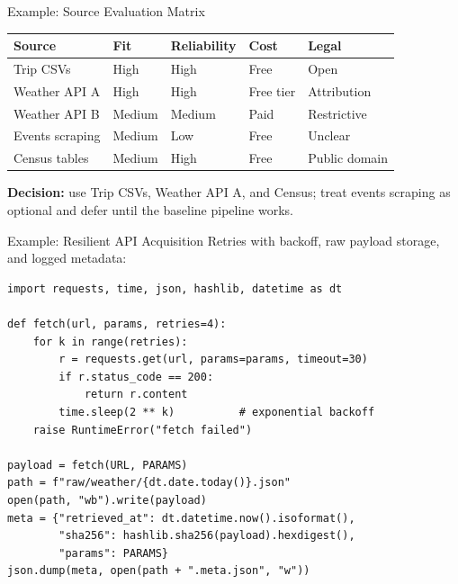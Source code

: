 \documentclass[aspectratio=43,11pt]{beamer}
\begin{document}
\begin{frame}{Example: Source Evaluation Matrix}
  \footnotesize
  \begin{tabular}{@{}lllll@{}}
    \toprule
    \textbf{Source} & \textbf{Fit} & \textbf{Reliability} & \textbf{Cost} & \textbf{Legal} \\
    \midrule
    Trip CSVs & High & High & Free & Open \\
    Weather API A & High & High & Free tier & Attribution \\
    Weather API B & Medium & Medium & Paid & Restrictive \\
    Events scraping & Medium & Low & Free & Unclear \\
    Census tables & Medium & High & Free & Public domain \\
    \bottomrule
  \end{tabular}

  \normalsize
  \medskip
  \textbf{Decision:} use Trip CSVs, Weather API A, and Census; treat events
  scraping as optional and defer until the baseline pipeline works.
\end{frame}

\begin{frame}[fragile]{Example: Resilient API Acquisition}
  Retries with backoff, raw payload storage, and logged metadata:

  \medskip
  \scriptsize
\begin{verbatim}
import requests, time, json, hashlib, datetime as dt

def fetch(url, params, retries=4):
    for k in range(retries):
        r = requests.get(url, params=params, timeout=30)
        if r.status_code == 200:
            return r.content
        time.sleep(2 ** k)          # exponential backoff
    raise RuntimeError("fetch failed")

payload = fetch(URL, PARAMS)
path = f"raw/weather/{dt.date.today()}.json"
open(path, "wb").write(payload)
meta = {"retrieved_at": dt.datetime.now().isoformat(),
        "sha256": hashlib.sha256(payload).hexdigest(),
        "params": PARAMS}
json.dump(meta, open(path + ".meta.json", "w"))
\end{verbatim}
\end{frame}
\end{document}
